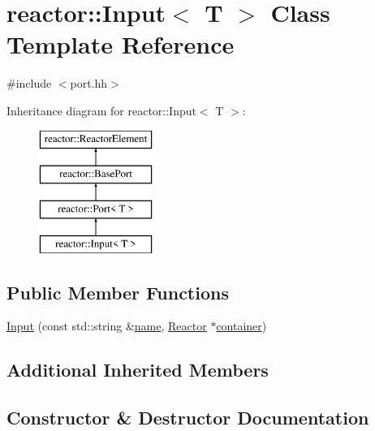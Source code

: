 \hypertarget{classreactor_1_1Input}{}\section{reactor\+:\+:Input$<$ T $>$ Class Template Reference}
\label{classreactor_1_1Input}


{\ttfamily \#include $<$port.\+hh$>$}

Inheritance diagram for reactor\+:\+:Input$<$ T $>$\+:\begin{figure}[H]
\begin{center}
\leavevmode
\includegraphics[height=4.000000cm]{classreactor_1_1Input}
\end{center}
\end{figure}
\subsection*{Public Member Functions}
\begin{DoxyCompactItemize}
\item 
\hyperlink{classreactor_1_1Input_a1c035f6840e363d515d92a4a20cd3b6a}{Input} (const std\+::string \&\hyperlink{classreactor_1_1ReactorElement_a99579f61dbaf5d5d98aebfe26eb8bf77}{name}, \hyperlink{classreactor_1_1Reactor}{Reactor} $\ast$\hyperlink{classreactor_1_1ReactorElement_a25bf298de879a82eefc1ba426be05812}{container})
\end{DoxyCompactItemize}
\subsection*{Additional Inherited Members}


\subsection{Constructor \& Destructor Documentation}
\mbox{\label{classreactor_1_1Input_a1c035f6840e363d515d92a4a20cd3b6a}} 
